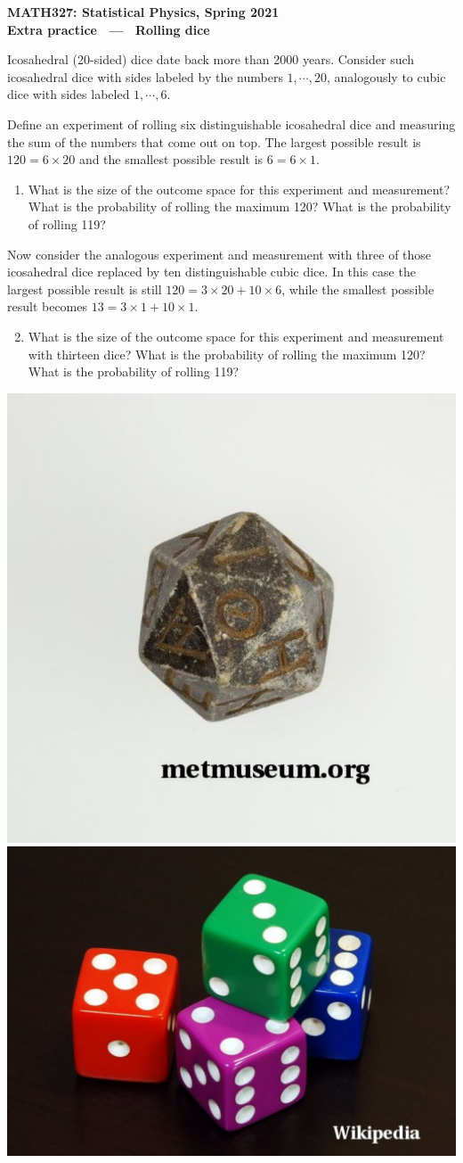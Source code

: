 \documentclass[12 pt]{article} %
\begin{document}
\newcommand{\thisweek}{MATH327 Extra (Dice)}
\newcommand{\moddate}{Last modified 2 May 2021}
\begin{center}
  {\Large \textbf{MATH327: Statistical Physics, Spring 2021}} \\[12 pt]
  {\Large \textbf{Extra practice \ --- \ Rolling dice}} \\[24 pt]
\end{center}

Icosahedral (20-sided) dice date back more than 2000 years.
Consider such icosahedral dice with sides labeled by the numbers $1, \cdots, 20$, analogously to cubic dice with sides labeled $1, \cdots, 6$.

Define an experiment of rolling six distinguishable icosahedral dice and measuring the sum of the numbers that come out on top.
The largest possible result is $120 = 6\times 20$ and the smallest possible result is $6 = 6\times 1$.

\begin{enumerate}[label={(\alph*)}]
  \item What is the size of the outcome space for this experiment and measurement?
        What is the probability of rolling the maximum 120?
        What is the probability of rolling 119?
\end{enumerate}

Now consider the analogous experiment and measurement with three of those icosahedral dice replaced by ten distinguishable cubic dice.
In this case the largest possible result is still $120 = 3\times 20 + 10\times 6$, while the smallest possible result becomes $13 = 3\times 1 + 10\times 1$.

\begin{enumerate}[label={(\alph*)}]
  \setcounter{enumi}{1}
  \item What is the size of the outcome space for this experiment and measurement with thirteen dice?
        What is the probability of rolling the maximum 120?
        What is the probability of rolling 119?
\end{enumerate}

\vspace{24 pt}
\begin{center}\includegraphics[height=5 cm]{figs/die20.pdf}\hfill \includegraphics[height=5 cm]{figs/die06.pdf}\end{center}
\end{document}
